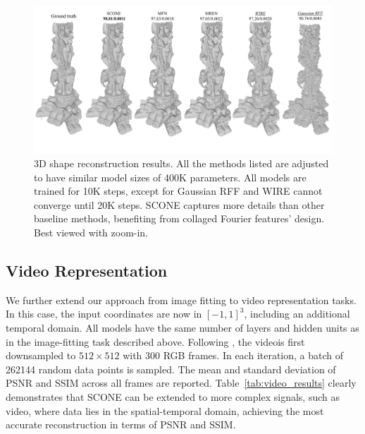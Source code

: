 \documentclass[letterpaper]{article} %
\begin{document}
\begin{figure}[th]
    \centering
    \includegraphics[width=2\columnwidth]{Figures/3d_visual.jpg}
    \caption{3D shape reconstruction results. All the methods listed are adjusted to have similar model sizes of 400K parameters. All models are trained for 10K steps, except for Gaussian RFF and WIRE cannot converge until 20K steps. SCONE captures more details than other baseline methods, benefiting from collaged Fourier features' design. Best viewed with zoom-in.}
    \label{fig:3d_results}
\end{figure}


\subsection{Video Representation}
\label{subsec:exp_video}
We further extend our approach from image fitting to video representation tasks. In this case, the input coordinates are now in $[-1, 1]^3$, including an additional temporal domain. All models have the same number of layers and hidden units as in the image-fitting task described above. Following \cite{2020siren}, the video\footnotemark[1] is first downsampled to $512\times512$ with 300 RGB frames. In each iteration, a batch of 262144 random data points is sampled. The mean and standard deviation of PSNR and SSIM across all frames are reported. Table~\ref{tab:video_results} clearly demonstrates that SCONE can be extended to more complex signals, such as video, where data lies in the spatial-temporal domain, achieving the most accurate reconstruction in terms of PSNR and SSIM.
\end{document}

